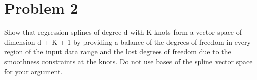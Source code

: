 \section*{Problem 2}

Show that regression splines of degree d with K knots form a vector space of dimension d + K + 1 by providing a balance of the degrees of freedom in every region of the input data range and the lost degrees of freedom due to the smoothness constraints at the knots. Do not use bases of the spline vector space for your argument.